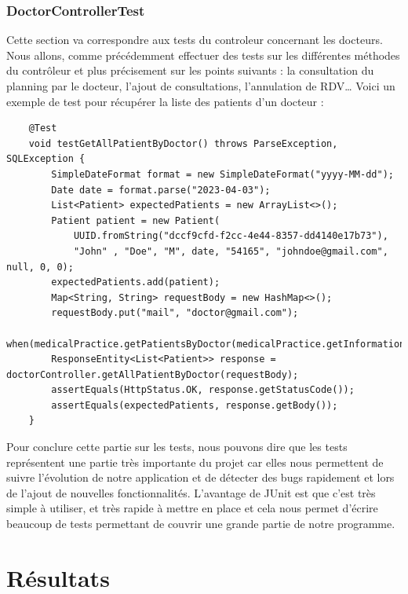 \documentclass[a4paper]{report}
\begin{document}
\subsection{DoctorControllerTest}
Cette section va correspondre aux tests du controleur concernant les docteurs. Nous allons, comme précédemment effectuer des tests sur les différentes méthodes du contrôleur et plus précisement sur les points suivants :
la consultation du planning par le docteur, l'ajout de consultations, l'annulation de RDV\dots
Voici un exemple de test pour récupérer la liste des patients d'un docteur : \newline
\begin{lstlisting}
    @Test
    void testGetAllPatientByDoctor() throws ParseException, SQLException {
        SimpleDateFormat format = new SimpleDateFormat("yyyy-MM-dd");
        Date date = format.parse("2023-04-03");
        List<Patient> expectedPatients = new ArrayList<>();
        Patient patient = new Patient(
            UUID.fromString("dccf9cfd-f2cc-4e44-8357-dd4140e17b73"),
            "John" , "Doe", "M", date, "54165", "johndoe@gmail.com", null, 0, 0);
        expectedPatients.add(patient);
        Map<String, String> requestBody = new HashMap<>();
        requestBody.put("mail", "doctor@gmail.com");
        when(medicalPractice.getPatientsByDoctor(medicalPractice.getInformationsDoctorByMail("doctor@gmail.com"))).thenReturn(expectedPatients);
        ResponseEntity<List<Patient>> response = doctorController.getAllPatientByDoctor(requestBody);
        assertEquals(HttpStatus.OK, response.getStatusCode());
        assertEquals(expectedPatients, response.getBody()); 
    }
\end{lstlisting}

Pour conclure cette partie sur les tests, nous pouvons dire que les tests représentent une partie très importante du projet car elles nous permettent de suivre l'évolution de notre application
et de détecter des bugs rapidement et lors de l'ajout de nouvelles fonctionnalités. L'avantage de JUnit est que c'est très simple à utiliser, et très rapide à mettre en place et cela nous permet
d'écrire beaucoup de tests permettant de couvrir une grande partie de notre programme.


\chapter{Résultats}
\end{document}
